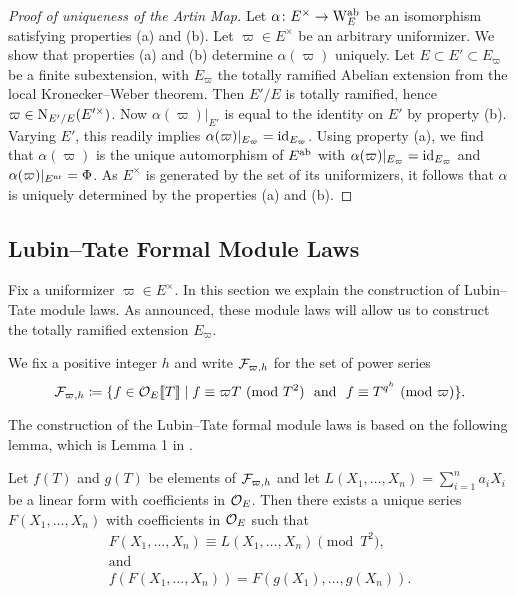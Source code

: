 \documentclass[../main.tex]{subfiles}
\begin{document}
\begin{proof}[Proof of uniqueness of the Artin Map]
  Let $\alpha\colon E^\times \to \mathrm W_E^{\mathrm{ab}}$ be
  an isomorphism satisfying properties (a) and (b). Let $\varpi \in E^\times$ be an arbitrary
  uniformizer. We show that properties (a) and (b) determine $\alpha(\varpi)$ uniquely.
  Let $E \subset E' \subset E_\varpi$ be a finite subextension, 
  with $E_\varpi$ the totally ramified Abelian extension from the local Kronecker--Weber
  theorem. Then $E'/E$ is totally ramified, hence $\varpi \in
  \mathrm{N}_{E'/E}(E'^\times)$. Now $\alpha(\varpi)|_{E'}$ is equal to the identity on $E'$
  by property (b). Varying $E'$, this readily implies $\alpha(\varpi)|_{E_\varpi} =
  \operatorname{id}_{E_\varpi}$. Using property (a), we find that $\alpha(\varpi)$ is the unique
  automorphism of $E^{\mathrm{ab}}$ with $\alpha(\varpi)|_{E_\varpi} = \operatorname{id}_{E_\varpi}$ and
  $\alpha(\varpi)|_{E^{\mathrm{nr}}} = \Phi$. As $E^\times$ is generated by the set of its
  uniformizers, it follows that $\alpha$ is uniquely determined by the properties (a) and (b).
\end{proof}

\subsection{Lubin--Tate Formal Module Laws} %
\label{sub:Lubin--Tate Formal Module Laws}
Fix a uniformizer $\varpi \in E^\times$. In this section we explain the construction
of Lubin--Tate module laws. As announced, these module laws will allow us to
construct the totally ramified extension $E_\varpi$.

We fix a positive integer $h$ and write $\mathcal{F}_{\varpi,h}$ for the set of power series
\begin{equation*}
  \cF_{\varpi,h} \coloneqq \{f \in \cO_E \llbr T \rrbr \mid f \equiv \varpi T
    \ (\text{mod } {T^2}) \ \text{ and } \ 
    f \equiv T^{q^h} \ (\text{mod }\varpi)\}. 
\end{equation*}

The construction of the Lubin--Tate formal module laws is based on the following 
lemma, which is Lemma 1 in \cite{LubinTateFormalMult}.
\begin{lem}\label{lem:LTLemma1}
  Let $f(T)$ and $g(T)$ be elements of $\mathcal{F}_{\varpi,h}$ and let 
  $L(X_1, \dots, X_n) = \sum_{i=1}^n a_i X_i$ be a linear form with coefficients in 
  ${\mathcal{O}_E}$. Then there exists a unique series $F(X_1, \dots, X_n)$ with coefficients 
  in ${\mathcal{O}_E}$ such that 
  \begin{gather*}
    F(X_1, \dots, X_n) \equiv L(X_1, \dots, X_n) \pmod {T^2}, \\ \text{and} \\
    f(F(X_1, \dots, X_n)) = F(g(X_1), \dots, g(X_n)).
  \end{gather*}
\end{lem}
\end{document}
